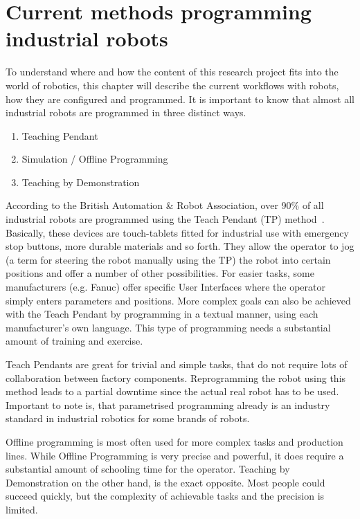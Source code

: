 \section{Current methods programming industrial robots}
To understand where and how the content of this research project fits into the world of robotics, this chapter will describe the current workflows with robots, how they are configured and programmed. It is important to know that almost all industrial robots are programmed in three distinct ways.
\begin{enumerate}
	\setcounter{enumi}{0}
	\setlength\itemsep{-1em}
	\item Teaching Pendant
	\item Simulation / Offline Programming
	\item Teaching by Demonstration
\end{enumerate}

According to the British Automation \& Robot Association, over 90\% of all industrial robots are programmed using the Teach Pendant (TP) method~\cite{bara}. Basically, these devices are touch-tablets fitted for industrial use with emergency stop buttons, more durable materials and so forth. They allow the operator to jog (a term for steering the robot manually using the TP) the robot into certain positions and offer a number of other possibilities. For easier tasks, some manufacturers (e.g. Fanuc) offer specific User Interfaces where the operator simply enters parameters and positions. More complex goals can also be achieved with the Teach Pendant by programming in a textual manner, using each manufacturer's own language. This type of programming needs a substantial amount of training and exercise.

Teach Pendants are great for trivial and simple tasks, that do not require lots of collaboration between factory components. Reprogramming the robot using this method leads to a partial downtime since the actual real robot has to be used. Important to note is, that parametrised programming already is an industry standard in industrial robotics for some brands of robots. 

Offline programming is most often used for more complex tasks and production lines. While Offline Programming is very precise and powerful, it does require a substantial amount of schooling time for the operator. Teaching by Demonstration on the other hand, is the exact opposite. Most people could succeed quickly, but the complexity of achievable tasks and the precision is limited.

